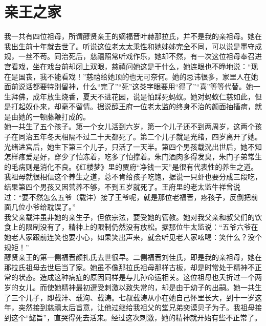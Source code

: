 \fancyhead[RO]{} %
\fancyhead[LE]{} %
\chapter*{亲王之家}
\thispagestyle{empty}
我一共有四位祖母，所谓醇贤亲王的嫡福晋叶赫那拉氏，并不是我的亲祖母。她在我出生前十年就去世了。听说这位老太太秉性和她姊姊完全不同，可以说是墨守成规，一丝不苟。同治死后，慈禧照常听戏作乐，她却不然，有一次这位祖母奉召进宫看戏，坐在戏台前却闭上双眼，慈禧问她这是干什么，她连眼也不睁地说：“现在是国丧，我不能看戏！”慈禧给她顶的也无可奈何。她的忌讳很多，家里人在她面前说话都要特别留神，什么“完了”“死”这类字眼要用“得了”“喜”等等代替。她一生拜佛，成年放生烧香，夏天不进花园，说是怕踩死蚂蚁。她对蚂蚁仁慈如此，但是打起奴仆来，却毫不留情。据说醇王府一位老太监的终身不治的颜面抽搐病，就是由她的一顿藤鞭打成的。\\

她一共生了五个孩子。第一个女儿活到六岁，第一个儿子还不到两周岁，这两个孩子在同治五年冬天相隔不过二十天都死了。第二个儿子就是光绪，四岁离开了她。光绪进宫后，她生下第三个儿子，只活了一天半。第四个男孩载洸出世后，她不知怎样疼爱是好，穿少了怕冻着，吃多了怕撑着。朱门酒肉多得发臭，朱门子弟常生的毛病则是消化不良。《红楼梦》里的贾府“净钱一天”是很有代表性的养生之道。我祖母就很相信这个养生之道，总不肯给孩子吃饱，据说一只虾也要分成三段吃，结果第四个男孩又因营养不够，不到五岁就死了。王府里的老太监牛祥曾说过：“要不然怎么五爷（载沣）接了王爷呢，就是那位老福晋，疼孩子，反倒把前面几位小爷给耽误了。”\\

我父亲载沣虽非她的亲生子，但依宗法，要受她的管教。她对我父亲和叔父们的饮食上的限制没有了，精神上的限制仍然没有放松。据那位牛太监说：“五爷六爷在她老人家跟前连笑也要小心，如果笑出声来，就会听见老人家吆喝：笑什么？没个规矩！”\\

醇贤亲王的第一侧福晋颜扎氏去世很早。二侧福晋刘佳氏，即是我的亲祖母，她在那拉氏祖母去世后当了家。她虽不像那拉氏祖母那样古板，却是时常处于精神不正常的状态。造成这种病症的原因同样是与儿孙命运相关。这位祖母也夭折过一个两岁的女儿。而使她精神最初遭受刺激以致失常的，却是由于幼子的出嗣。她一共生了三个儿子，即载沣、载洵、载涛。七叔载涛从小在她自己怀里长大，到十一岁这年，突然接到慈禧太后旨意，让他过继给我祖父的堂兄弟奕谟贝子为子。我祖母接到这个“懿旨”，直哭得死去活来。经过这次刺激，她的精神就开始有些不正常了。\\

